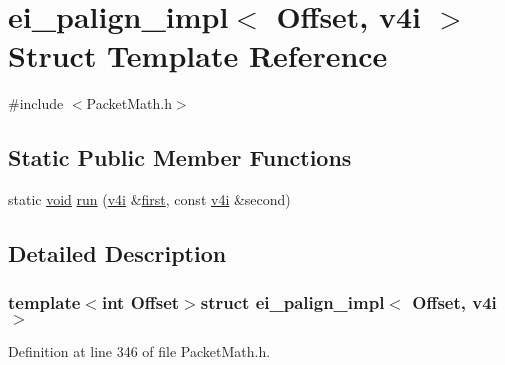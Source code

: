 \hypertarget{structei__palign__impl_3_01_offset_00_01v4i_01_4}{\section{ei\-\_\-palign\-\_\-impl$<$ Offset, v4i $>$ Struct Template Reference}
\label{structei__palign__impl_3_01_offset_00_01v4i_01_4}
}


{\ttfamily \#include $<$Packet\-Math.\-h$>$}

\subsection*{Static Public Member Functions}
\begin{DoxyCompactItemize}
\item 
static \hyperlink{group___u_a_v_objects_plugin_ga444cf2ff3f0ecbe028adce838d373f5c}{void} \hyperlink{structei__palign__impl_3_01_offset_00_01v4i_01_4_a72c4608a8008942ab819d8e88c29e1fe}{run} (\hyperlink{_alti_vec_2_packet_math_8h_a04a2325bab18a1292103e0dd8ef1046b}{v4i} \&\hyperlink{glext_8h_a970a385f6f880f2b620451db4ca4299a}{first}, const \hyperlink{_alti_vec_2_packet_math_8h_a04a2325bab18a1292103e0dd8ef1046b}{v4i} \&second)
\end{DoxyCompactItemize}


\subsection{Detailed Description}
\subsubsection*{template$<$int Offset$>$struct ei\-\_\-palign\-\_\-impl$<$ Offset, v4i $>$}



Definition at line 346 of file Packet\-Math.\-h.



